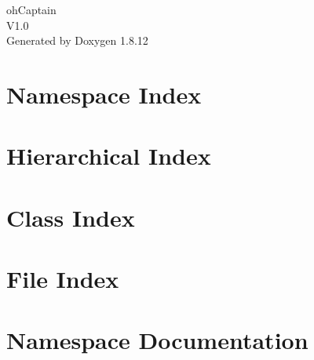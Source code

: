 \documentclass[twoside]{book}
\newcommand{\+}{\discretionary{\mbox{\scriptsize$\hookleftarrow$}}{}{}}
\newcommand{\clearemptydoublepage}{%
  \newpage{\pagestyle{empty}\cleardoublepage}%
}
\begin{document}
\hypersetup{pageanchor=false,
             bookmarksnumbered=true,
             pdfencoding=unicode
            }
\begin{titlepage}
\vspace*{7cm}
\begin{center}%
{\Large oh\+Captain \\[1ex]\large V1.\+0 }\\
\vspace*{1cm}
{\large Generated by Doxygen 1.8.12}\\
\end{center}
\end{titlepage}
\clearemptydoublepage
{}
\tableofcontents
\clearemptydoublepage
{}
\hypersetup{pageanchor=true}

\chapter{Namespace Index}

\chapter{Hierarchical Index}

\chapter{Class Index}

\chapter{File Index}

\chapter{Namespace Documentation}











\end{document}
